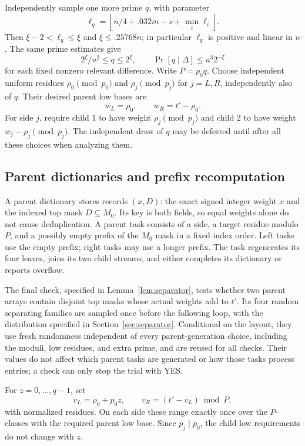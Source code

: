 Independently sample one more prime $q$, with parameter
\[
 \ell_q=\left\lfloor n/4+.032m-s+\min_i\ell_i\right\rfloor.
\]
Then $\xi-2<\ell_q\le \xi$ and $\xi\le .25768n$; in particular $\ell_q$ is
positive and linear in $n$.  The same prime estimates give
\begin{equation}\label{alg:q-bounds}
 2^\xi/u^2\le q\le 2^\xi,
 \qquad \Pr[q\mid\Delta]\le u^3 2^{-\xi}
\end{equation}
for each fixed nonzero relevant difference.  Write $P=p_0q$.  Choose
independent uniform residues $\rho_0\pmod {p_0}$ and
$\rho_j\pmod {p_j}$ for $j=L,R$, independently also of $q$.  Their
desired parent low bases are
\[
 w_L=\rho_0,\qquad w_R=t'-\rho_0.
\]
For side $j$, require child 1 to have weight $\rho_j\pmod {p_j}$ and
child 2 to have weight $w_j-\rho_j\pmod {p_j}$.  The independent draw of
$q$ may be deferred until after all these choices when analyzing them.

\subsection{Parent dictionaries and prefix recomputation}
\label{alg:parents}

A parent dictionary stores records $(x,D)$: the exact signed integer
weight $x$ and the indexed top mask $D\subseteq M_0$. Its key is both
fields, so equal weights alone do not cause deduplication. A parent
task consists of a side, a target residue modulo $P$, and a possibly
empty prefix of the $M_0$ mask in a fixed index order. Left tasks use
the empty prefix; right tasks may use a longer prefix. The task regenerates its four leaves, joins its two child
streams, and either completes its dictionary or reports overflow.

The final check, specified in Lemma~\ref{lem:separator}, tests whether two
parent arrays contain disjoint top masks whose actual weights add to
$t'$.  Its four random separating families are sampled once before the
following loop, with the distribution specified in
Section~\ref{sec:separator}. Conditional on the layout, they use fresh
randomness independent of every parent-generation choice, including
the moduli, low residues, and extra prime, and are reused for all checks.
Their values do not affect which parent tasks are generated or how
those tasks process entries; a check can only stop the trial with YES.

For $z=0,\ldots,q-1$, set
\[
 v_L=\rho_0+p_0z,
 \qquad v_R=(t'-v_L)\bmod P,
\]
with normalized residues.  On each side these range exactly once over
the $P$-classes with the required parent low base.  Since $p_j\mid p_0$,
the child low requirements do not change with $z$.

